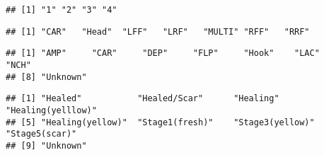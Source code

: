 \documentclass[
]{article}
\newenvironment{Shaded}{\begin{snugshade}}{\end{snugshade}}
\newcommand{\FunctionTok}[1]{\textcolor[rgb]{0.13,0.29,0.53}{\textbf{#1}}}
\newcommand{\NormalTok}[1]{#1}
\newcommand{\OtherTok}[1]{\textcolor[rgb]{0.56,0.35,0.01}{#1}}
\newcommand{\SpecialCharTok}[1]{\textcolor[rgb]{0.81,0.36,0.00}{\textbf{#1}}}
\begin{document}
\begin{verbatim}
## [1] "1" "2" "3" "4"
\end{verbatim}

\begin{Shaded}
\end{Shaded}

\begin{verbatim}
## [1] "CAR"   "Head"  "LFF"   "LRF"   "MULTI" "RFF"   "RRF"
\end{verbatim}

\begin{Shaded}
\end{Shaded}

\begin{verbatim}
## [1] "AMP"     "CAR"     "DEP"     "FLP"     "Hook"    "LAC"     "NCH"    
## [8] "Unknown"
\end{verbatim}

\begin{Shaded}
\end{Shaded}

\begin{verbatim}
## [1] "Healed"           "Healed/Scar"      "Healing"          "Healing(yelllow)"
## [5] "Healing(yellow)"  "Stage1(fresh)"    "Stage3(yellow)"   "Stage5(scar)"    
## [9] "Unknown"
\end{verbatim}

\begin{Shaded}
\end{Shaded}
\end{document}
